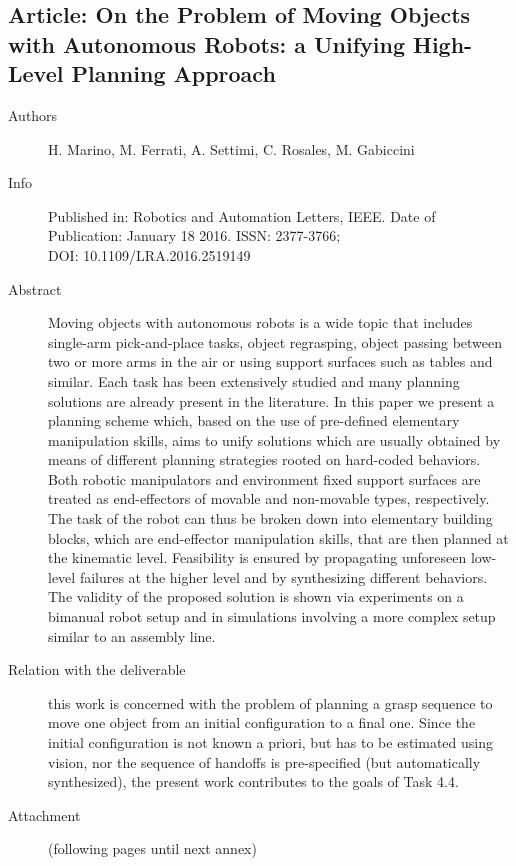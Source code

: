 \documentclass[a4paper,11pt,pdf]{pacmanreport}
\begin{document}
\subsection{Article: On the Problem of Moving Objects with Autonomous Robots: a Unifying High-Level Planning Approach}
\label{ann:highLevelPlanning}
\begin{description}
    \item[Authors] H. Marino, M. Ferrati, A. Settimi, C. Rosales, M. Gabiccini
    \item[Info] Published in: Robotics and Automation Letters, IEEE. Date of Publication: January 18 2016. ISSN: 2377-3766;\\
         DOI: 10.1109/LRA.2016.2519149
    \item[Abstract] Moving objects with autonomous robots is a wide topic that includes single-arm pick-and-place tasks, object regrasping, object passing between two or more arms in the air or using support surfaces such as tables and similar. Each task has been extensively studied and many planning solutions are already present in the literature. In this paper we present a planning scheme which, based on the use of pre-defined elementary manipulation skills, aims to unify solutions which are usually obtained by means of different planning strategies rooted on hard-coded behaviors. Both robotic manipulators and environment fixed support surfaces are treated as end-effectors of movable and non-movable types, respectively. The task of the robot can thus be broken down into elementary building blocks, which are end-effector manipulation skills, that are then planned at the kinematic level. Feasibility is ensured by propagating unforeseen low-level failures at the higher level and by synthesizing different behaviors. The validity of the proposed solution is shown via experiments on a bimanual robot setup and in simulations involving a more complex setup similar to an assembly line.
    \item[Relation with the deliverable] this work is concerned with the problem of planning a grasp sequence to move one object from an initial configuration to a final one. Since the initial configuration is not known a priori, but has to be estimated using vision, nor the sequence of handoffs is pre-specified (but automatically synthesized), the present work contributes to the goals of Task 4.4.
    \item[Attachment] (following pages until next annex)
\end{description}

\end{document}
